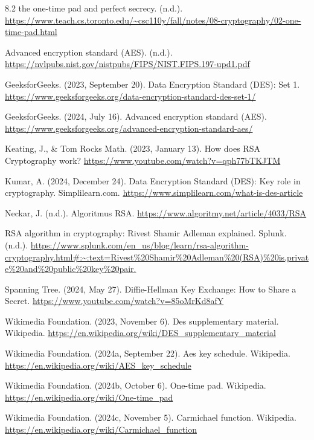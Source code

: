 \documentclass[12pt,a4paper]{report}
\begin{document}
\begin{thebibliography}{99}

8.2 the one-time pad and perfect secrecy. (n.d.).
\url{https://www.teach.cs.toronto.edu/~csc110y/fall/notes/08-cryptography/02-one-time-pad.html}

Advanced encryption standard (AES). (n.d.).
\url{https://nvlpubs.nist.gov/nistpubs/FIPS/NIST.FIPS.197-upd1.pdf}

GeeksforGeeks. (2023, September 20). Data Encryption Standard (DES): Set 1.
\url {https://www.geeksforgeeks.org/data-encryption-standard-des-set-1/}

GeeksforGeeks. (2024, July 16). Advanced encryption standard (AES).
\url {https://www.geeksforgeeks.org/advanced-encryption-standard-aes/}

Keating, J., \& Tom Rocks Math. (2023, January 13). How does RSA Cryptography work?
\url{https://www.youtube.com/watch?v=qph77bTKJTM}

Kumar, A. (2024, December 24). Data Encryption Standard (DES): Key role in cryptography. Simplilearn.com.
\url{https://www.simplilearn.com/what-is-des-article}

Neckar, J. (n.d.). Algoritmus RSA.
\url{https://www.algoritmy.net/article/4033/RSA}

RSA algorithm in cryptography: Rivest Shamir Adleman explained. Splunk. (n.d.).
\url{https://www.splunk.com/en_us/blog/learn/rsa-algorithm-cryptography.html#:~:text=Rivest%20Shamir%20Adleman%20(RSA)%20is,private%20and%20public%20key%20pair.}

Spanning Tree. (2024, May 27). Diffie-Hellman Key Exchange: How to Share a Secret.
\url{https://www.youtube.com/watch?v=85oMrKd8afY}

Wikimedia Foundation. (2023, November 6). Des supplementary material. Wikipedia.
\url{https://en.wikipedia.org/wiki/DES_supplementary_material}

Wikimedia Foundation. (2024a, September 22). Aes key schedule. Wikipedia.
\url{https://en.wikipedia.org/wiki/AES_key_schedule} 

Wikimedia Foundation. (2024b, October 6). One-time pad. Wikipedia.
\url{https://en.wikipedia.org/wiki/One-time_pad}

Wikimedia Foundation. (2024c, November 5). Carmichael function. Wikipedia.
\url{https://en.wikipedia.org/wiki/Carmichael_function}


\end{thebibliography}
\end{document}

